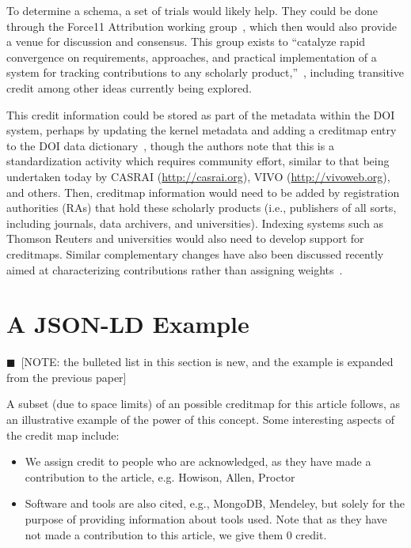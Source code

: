 \documentclass[a4paper,10pt]{article}
\newcommand{\note}[1]{{\color{darkgreen}$\blacksquare$~\textsf{[NOTE: #1]}}}
\begin{document}
To determine a schema, a set of trials would likely help. They could be done through the Force11 Attribution working group~\cite{force11AWG}, which then would also provide a venue for discussion and consensus. This group exists to ``catalyze rapid convergence on requirements, approaches, and practical implementation of a system for tracking contributions to any scholarly product,''~\cite{force11AWG}, including transitive credit among other ideas currently being explored.

This credit information could be stored as part of the metadata within the DOI system, perhaps by updating the kernel metadata and adding a creditmap entry to the DOI data dictionary~\cite{DOI-data-model}, though the authors note that this is a standardization activity which requires community effort, similar to that being undertaken today by CASRAI (\url{http://casrai.org}), VIVO (\url{http://vivoweb.org}), and others. Then, creditmap information would need to be added by registration authorities (RAs) that hold these scholarly products (i.e., publishers of all sorts, including journals, data archivers, and universities). Indexing systems such as Thomson Reuters and universities would also need to develop support for creditmaps. Similar complementary changes have also been discussed recently aimed at characterizing contributions rather than assigning weights~\cite{metatags,contributorship-taxonomy,teams}.

\section{A JSON-LD Example}

\note{the bulleted list in this section is new, and the example is expanded from the previous paper}

A subset (due to space limits) of an possible creditmap for this article follows, as an illustrative example of the power of this concept. Some interesting aspects of the credit map include:
\begin{itemize}
\item We assign credit to people who are acknowledged, as they have made a contribution to the article, e.g. Howison, Allen, Proctor
\item Software and tools are also cited, e.g., MongoDB, Mendeley, but solely for the purpose of providing information about tools used. Note that as they have not made a contribution to this article, we give them 0 credit.
\end{itemize}
\end{document}
